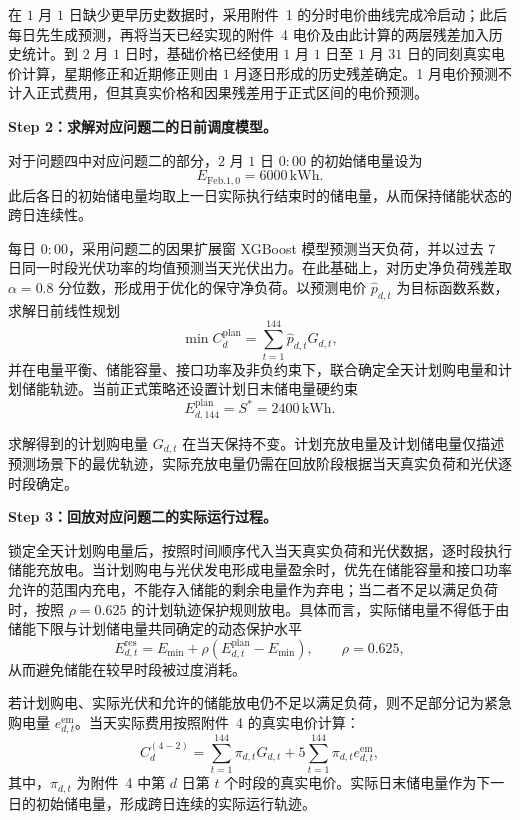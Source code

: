 在 $1$ 月 $1$ 日缺少更早历史数据时，采用附件~1 的分时电价曲线完成冷启动；此后每日先生成预测，再将当天已经实现的附件~4 电价及由此计算的两层残差加入历史统计。到 $2$ 月 $1$ 日时，基础价格已经使用 $1$ 月 $1$ 日至 $1$ 月 $31$ 日的同刻真实电价计算，星期修正和近期修正则由 $1$ 月逐日形成的历史残差确定。1 月电价预测不计入正式费用，但其真实价格和因果残差用于正式区间的电价预测。

\textbf{Step 2：求解对应问题二的日前调度模型。}

对于问题四中对应问题二的部分，$2$ 月 $1$ 日 $0{:}00$ 的初始储电量设为
\begin{equation}
E_{\mathrm{Feb.1},0}=6000\,\mathrm{kWh}.
\end{equation}
此后各日的初始储电量均取上一日实际执行结束时的储电量，从而保持储能状态的跨日连续性。

每日 $0{:}00$，采用问题二的因果扩展窗 XGBoost 模型预测当天负荷，并以过去 $7$ 日同一时段光伏功率的均值预测当天光伏出力。在此基础上，对历史净负荷残差取 $\alpha=0.8$ 分位数，形成用于优化的保守净负荷。以预测电价 $\hat p_{d,t}$ 为目标函数系数，求解日前线性规划
\begin{equation}
\min C_{d}^{\mathrm{plan}}
=
\sum_{t=1}^{144}\hat p_{d,t}G_{d,t},
\end{equation}
并在电量平衡、储能容量、接口功率及非负约束下，联合确定全天计划购电量和计划储能轨迹。当前正式策略还设置计划日末储电量硬约束
\begin{equation}
E_{d,144}^{\mathrm{plan}}
=S^{*}=2400\,\mathrm{kWh}.
\end{equation}

求解得到的计划购电量 $G_{d,t}$ 在当天保持不变。计划充放电量及计划储电量仅描述预测场景下的最优轨迹，实际充放电量仍需在回放阶段根据当天真实负荷和光伏逐时段确定。

\textbf{Step 3：回放对应问题二的实际运行过程。}

锁定全天计划购电量后，按照时间顺序代入当天真实负荷和光伏数据，逐时段执行储能充放电。当计划购电与光伏发电形成电量盈余时，优先在储能容量和接口功率允许的范围内充电，不能存入储能的剩余电量作为弃电；当二者不足以满足负荷时，按照 $\rho=0.625$ 的计划轨迹保护规则放电。具体而言，实际储电量不得低于由储能下限与计划储电量共同确定的动态保护水平
\begin{equation}
E_{d,t}^{\mathrm{res}}
=E_{\min}+\rho\left(E_{d,t}^{\mathrm{plan}}-E_{\min}\right),
\qquad \rho=0.625,
\end{equation}
从而避免储能在较早时段被过度消耗。

若计划购电、实际光伏和允许的储能放电仍不足以满足负荷，则不足部分记为紧急购电量 $e_{d,t}^{\mathrm{em}}$。当天实际费用按照附件~4 的真实电价计算：
\begin{equation}
C_{d}^{(4-2)}
=
\sum_{t=1}^{144}\pi_{d,t}G_{d,t}
+
5\sum_{t=1}^{144}\pi_{d,t}e_{d,t}^{\mathrm{em}},
\label{eq:q42_actual_cost}
\end{equation}
其中，$\pi_{d,t}$ 为附件~4 中第 $d$ 日第 $t$ 个时段的真实电价。实际日末储电量作为下一日的初始储电量，形成跨日连续的实际运行轨迹。

